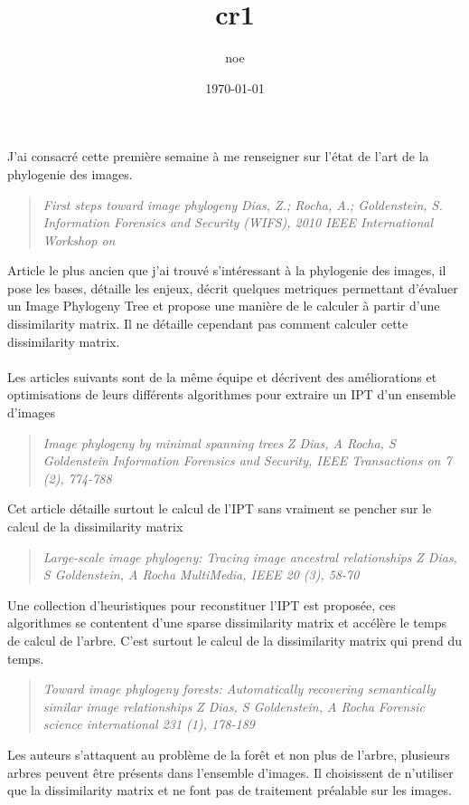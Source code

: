 \documentclass[11pt]{article}
\author{noe}
\date{\today}
\title{cr1}
\begin{document}
\maketitle
\tableofcontents


J'ai consacré cette première semaine à me renseigner sur l'état de l'art de la phylogenie des images.

\begin{quote}
\emph{First steps toward image phylogeny}
\emph{Dias, Z.; Rocha, A.; Goldenstein, S.}
\emph{Information Forensics and Security (WIFS), 2010 IEEE International Workshop on}
\end{quote}

Article le plus ancien que j'ai trouvé s'intéressant à la phylogenie des images, il pose les bases, détaille les enjeux, décrit quelques metriques permettant d'évaluer un Image Phylogeny Tree et propose une manière de le calculer à partir d'une dissimilarity matrix. Il ne détaille cependant pas comment calculer cette dissimilarity matrix.
\\ \\
Les articles suivants sont de la même équipe et décrivent des améliorations et optimisations de leurs différents algorithmes pour extraire un IPT d'un ensemble d'images

\begin{quote}
\emph{Image phylogeny by minimal spanning trees}
\emph{Z Dias, A Rocha, S Goldenstein}
\emph{Information Forensics and Security, IEEE Transactions on 7 (2), 774-788}
\end{quote}
Cet article détaille surtout le calcul de l'IPT sans vraiment se pencher sur le calcul de la dissimilarity matrix

\begin{quote}
\emph{Large-scale image phylogeny: Tracing image ancestral relationships}
\emph{Z Dias, S Goldenstein, A Rocha}
\emph{MultiMedia, IEEE 20 (3), 58-70}
\end{quote}
Une collection d'heuristiques pour reconstituer l'IPT est proposée, ces algorithmes se contentent d'une sparse dissimilarity matrix et accélère le temps de calcul de l'arbre. C'est surtout le calcul de la dissimilarity matrix qui prend du temps.

\begin{quote}
\emph{Toward image phylogeny forests: Automatically recovering semantically similar image relationships}
\emph{Z Dias, S Goldenstein, A Rocha}
\emph{Forensic science international 231 (1), 178-189}
\end{quote}
Les auteurs s'attaquent au problème de la forêt et non plus de l'arbre, plusieurs arbres peuvent être présents dans l'ensemble d'images. Il choisissent de n'utiliser que la dissimilarity matrix et ne font pas de traitement préalable sur les images.
\end{document}
